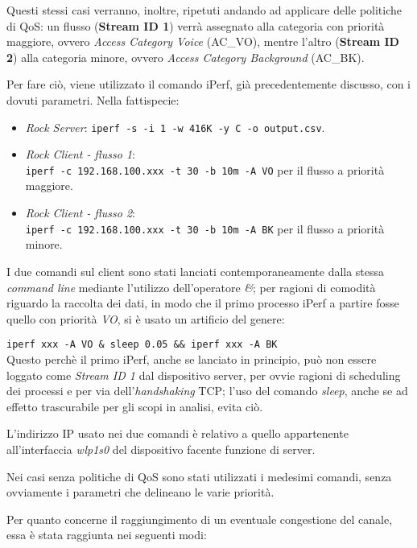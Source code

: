 Questi stessi casi verranno, inoltre, ripetuti andando ad applicare delle politiche di QoS: un flusso (\textbf{Stream ID 1}) verrà assegnato alla categoria con priorità maggiore, ovvero \textit{Access Category Voice} (AC\_VO), mentre l'altro (\textbf{Stream ID 2}) alla categoria minore, ovvero \textit{Access Category Background} (AC\_BK).

Per fare ciò, viene utilizzato il comando iPerf, già precedentemente discusso, con i dovuti parametri. Nella fattispecie:

\begin{itemize}
    \item \textit{Rock Server}: \verb|iperf -s -i 1 -w 416K -y C -o output.csv|.
    \item \textit{Rock Client - flusso 1}: \\\verb|iperf -c 192.168.100.xxx -t 30 -b 10m -A VO| per il flusso a priorità maggiore.
    \item \textit{Rock Client - flusso 2}: \\\verb|iperf -c 192.168.100.xxx -t 30 -b 10m -A BK| per il flusso a priorità minore.
\end{itemize}

I due comandi sul client sono stati lanciati contemporaneamente dalla stessa \textit{command line} mediante l'utilizzo dell'operatore \textit{\&}; per ragioni di comodità riguardo la raccolta dei dati, in modo che il primo processo iPerf a partire fosse quello con priorità \textit{VO}, si è usato un artificio del genere:

\verb|iperf xxx -A VO & sleep 0.05 && iperf xxx -A BK| \\
\noindent Questo perchè il primo iPerf, anche se lanciato in principio, può non essere loggato come \textit{Stream ID 1} dal dispositivo server, per ovvie ragioni di scheduling dei processi e per via dell'\textit{handshaking} TCP; l'uso del comando \textit{sleep}, anche se ad effetto trascurabile per gli scopi in analisi, evita ciò.

L'indirizzo IP usato nei due comandi è relativo a quello appartenente all'interfaccia \textit{wlp1s0} del dispositivo facente funzione di server.

Nei casi senza politiche di QoS sono stati utilizzati i medesimi comandi, senza ovviamente i parametri che delineano le varie priorità.

Per quanto concerne il raggiungimento di un eventuale congestione del canale, essa è stata raggiunta nei seguenti modi:

